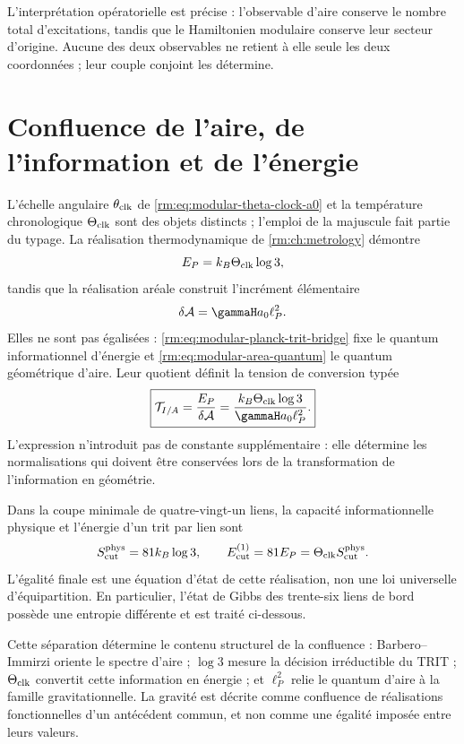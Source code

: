 L’interprétation opératorielle est précise : l’observable d’aire conserve le nombre total d’excitations, tandis que le Hamiltonien modulaire conserve leur secteur d’origine. Aucune des deux observables ne retient à elle seule les deux coordonnées ; leur couple conjoint les détermine.

\section{Confluence de l’aire, de l’information et de l’énergie}

L’échelle angulaire \(\theta_{\rm clk}\) de \cref{rm:eq:modular-theta-clock-a0} et la température chronologique \(\Theta_{\rm clk}\) sont des objets distincts ; l’emploi de la majuscule fait partie du typage. La réalisation thermodynamique de \cref{rm:ch:metrology} démontre
\begin{equation}
\label{rm:eq:modular-planck-trit-bridge}
E_P=k_B\Theta_{\rm clk}\log3,
\end{equation}
tandis que la réalisation aréale construit l’incrément élémentaire
\begin{equation}
\label{rm:eq:modular-area-quantum}
\delta\mathcal A
=\gammaH a_0\ell_P^2.
\end{equation}
Elles ne sont pas égalisées : \cref{rm:eq:modular-planck-trit-bridge} fixe le quantum informationnel d’énergie et \cref{rm:eq:modular-area-quantum} le quantum géométrique d’aire. Leur quotient définit la tension de conversion typée
\begin{equation}
\label{rm:eq:modular-information-area-tension}
\boxed{
\mathcal T_{I/A}
=\frac{E_P}{\delta\mathcal A}
=\frac{k_B\Theta_{\rm clk}\log3}
{\gammaH a_0\ell_P^2}.}
\end{equation}
L’expression n’introduit pas de constante supplémentaire : elle détermine les normalisations qui doivent être conservées lors de la transformation de l’information en géométrie.


Dans la coupe minimale de quatre-vingt-un liens, la capacité informationnelle physique et l’énergie d’un trit par lien sont
\begin{equation}
\label{rm:eq:modular-cut-info-energy}
S_{\rm cut}^{\rm phys}=81k_B\log3,
\qquad
E_{\rm cut}^{(1)}=81E_P
=\Theta_{\rm clk}S_{\rm cut}^{\rm phys}.
\end{equation}
L’égalité finale est une équation d’état de cette réalisation, non une loi universelle d’équipartition. En particulier, l’état de Gibbs des trente-six liens de bord possède une entropie différente et est traité ci-dessous.

Cette séparation détermine le contenu structurel de la confluence : Barbero--Immirzi oriente le spectre d’aire ; \(\log3\) mesure la décision irréductible du TRIT ; \(\Theta_{\rm clk}\) convertit cette information en énergie ; et \(\ell_P^2\) relie le quantum d’aire à la famille gravitationnelle. La gravité est décrite comme confluence de réalisations fonctionnelles d’un antécédent commun, et non comme une égalité imposée entre leurs valeurs.
